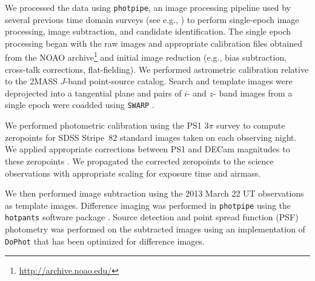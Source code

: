 We processed the data using {\tt photpipe}, an image processing pipeline used by several previous time domain surveys (see e.g., \citealt{Rest+05,Rest+14}) to perform single-epoch image processing, image subtraction, and candidate identification. The single epoch processing began with the raw images and appropriate calibration files obtained from the NOAO archive\footnote{\url{http://archive.noao.edu/}} and initial image reduction (e.g., bias subtraction, cross-talk corrections, flat-fielding). We performed astrometric calibration relative to the 2MASS $J$-band point-source catalog. Search and template images were deprojected into a tangential plane and pairs of $i$- and $z$- band images from a single epoch were coadded using {\tt SWARP} \citep{Bertin+02}.

We performed photometric calibration using the PS1 3$\pi$ survey to compute zeropoints for SDSS Stripe~82 standard images taken on each observing night. We applied appropriate corrections between PS1 and DECam magnitudes to these zeropoints \citep{Scolnic+15}. We propagated the corrected zeropoints to the science observations with appropriate scaling for exposure time and airmass.

We then performed image subtraction using the 2013 March 22 UT observations as template images. Difference imaging was performed in {\tt photpipe} using the {\tt hotpants} software package \citep{Alard2000,Becker2015}. Source detection and point spread function (PSF) photometry was performed on the subtracted images using an implementation of {\tt DoPhot} \citep{Schechter+93} that has been optimized for difference images.

